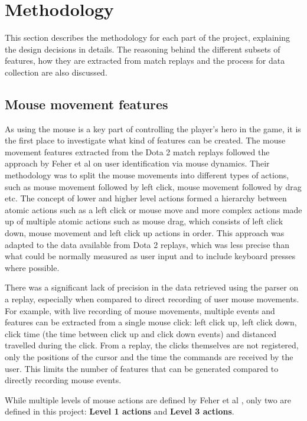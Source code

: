 \documentclass[Report.tex]{subfiles}
\begin{document}
\section{Methodology}\label{sec:methodology}
This section describes the methodology for each part of the project, explaining the design decisions in details. The reasoning behind the different subsets of features, how they are extracted from match replays and the process for data collection are also discussed.

\subsection{Mouse movement features}\label{sec:mm-features}
As using the mouse is a key part of controlling the player's hero in the game, it is the first place to investigate what kind of features can be created. The mouse movement features extracted from the Dota 2 match replays followed the approach by Feher et al \cite{mouse-dynamics} on user identification via mouse dynamics. Their methodology was to split the mouse movements into different types of actions, such as mouse movement followed by left click, mouse movement followed by drag etc. The concept of lower and higher level actions formed a hierarchy between atomic actions such as a left click or mouse move and more complex actions made up of multiple atomic actions such as mouse drag, which consists of left click down, mouse movement and left click up actions in order. This approach was adapted to the data available from Dota 2 replays, which was less precise than what could be normally measured as user input and to include keyboard presses where possible. 

There was a significant lack of precision in the data retrieved using the parser on a replay, especially when compared to direct recording of user mouse movements. For example, with live recording of mouse movements, multiple events and features can be extracted from a single mouse click: left click up, left click down, click time (the time between click up and click down events) and distanced travelled during the click. From a replay, the clicks themselves are not registered, only the positions of the cursor and the time the commands are received by the user. This limits the number of features that can be generated compared to directly recording mouse events.

While multiple levels of mouse actions are defined by Feher et al \cite{mouse-dynamics}, only two are defined in this project: \textbf{Level 1 actions} and \textbf{Level 3 actions}.
\end{document}
